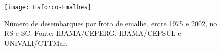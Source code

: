 \documentclass[a4paper,11pt,twoside,showtrims,onecolumn,openright,final]{memoir}
\begin{document}
%
%

\begin{figure}
\begin{center}
\texttt{[image: Esforco-Emalhes]}
\end{center}
\caption[Número de desembarques por frota de emalhe, entre 1975 e 2002, no RS e SC.]
        {Número de desembarques por frota de emalhe, entre 1975 e 2002, no RS e SC. 
	 Fonte: IBAMA/CEPERG, IBAMA/CEPSUL e UNIVALI/CTTMar.}
\label{fig:malheiros-esforco}
\end{figure}






\end{document}
